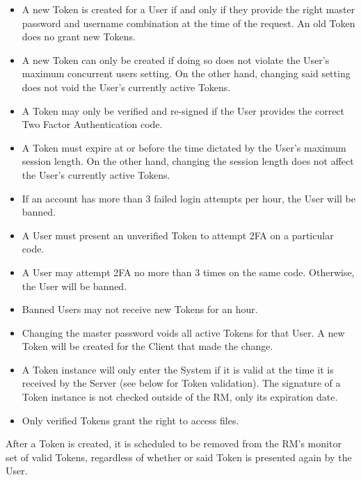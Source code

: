 \documentclass{article}
\begin{document}
\begin{itemize}
  \item A new Token is created for a User if and only if they provide the right master password and username combination at the time of the request. An old Token does no grant new Tokens.
  \item A new Token can only be created if doing so does not violate the User's maximum concurrent users setting. On the other hand, changing said setting does not void the User's currently active Tokens.
  \item A Token may only be verified and re-signed if the User provides the correct Two Factor Authentication code.
  \item A Token must expire at or before the time dictated by the User's maximum session length. On the other hand, changing the session length does not affect the User's currently active Tokens.
  \item If an account has more than 3 failed login attempts per hour, the User will be banned.
  \item A User must present an unverified Token to attempt 2FA on a particular code.
  \item A User may attempt 2FA no more than 3 times on the same code. Otherwise, the User will be banned.
  \item Banned Users may not receive new Tokens for an hour.
  \item Changing the master password voids all active Tokens for that User. A new Token will be created for the Client that made the change.
  \item A Token instance will only enter the System if it is valid at the time it is received by the Server (see below for Token validation). The signature of a Token instance is not checked outside of the RM, only its expiration date.
  \item Only verified Tokens grant the right to access files.
\end{itemize}
\par After a Token is created, it is scheduled to be removed from the RM's monitor set of valid Tokens, regardless of whether or said Token is presented again by the User.
\end{document}
